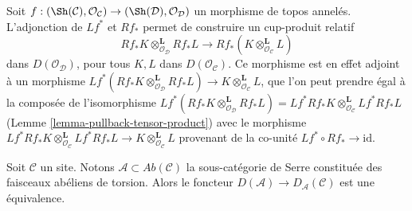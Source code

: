\begin{remark}
\label{remark-cup-product}
Soit $f : (\Sh(\mathcal{C}), \mathcal{O}_\mathcal{C}) \to
(\Sh(\mathcal{D}), \mathcal{O}_\mathcal{D})$ un morphisme de topos
annelés. L'adjonction de $Lf^*$ et $Rf_*$ permet de construire un cup-produit
relatif
$$
Rf_*K \otimes_{\mathcal{O}_\mathcal{D}}^\mathbf{L} Rf_*L
\longrightarrow
Rf_*(K \otimes_{\mathcal{O}_\mathcal{C}}^\mathbf{L} L)
$$
dans $D(\mathcal{O}_\mathcal{D})$, pour tous $K, L$ dans
$D(\mathcal{O}_\mathcal{C})$. Ce morphisme est en effet adjoint à un
morphisme
$Lf^*(Rf_*K \otimes_{\mathcal{O}_\mathcal{D}}^\mathbf{L} Rf_*L) \to
K \otimes_{\mathcal{O}_\mathcal{C}}^\mathbf{L} L$, que l'on peut prendre
égal à la composée de l'isomorphisme
$Lf^*(Rf_*K \otimes_{\mathcal{O}_\mathcal{D}}^\mathbf{L} Rf_*L) =
Lf^*Rf_*K \otimes_{\mathcal{O}_\mathcal{C}}^\mathbf{L} Lf^*Rf_*L$
(Lemme \ref{lemma-pullback-tensor-product}) avec le morphisme
$Lf^*Rf_*K \otimes_{\mathcal{O}_\mathcal{C}}^\mathbf{L} Lf^*Rf_*L
\to K \otimes_{\mathcal{O}_\mathcal{C}}^\mathbf{L} L$
provenant de la co-unité $Lf^* \circ Rf_* \to \text{id}$.
\end{remark}

\begin{lemma}
\label{lemma-torsion}
Soit $\mathcal{C}$ un site. Notons
$\mathcal{A} \subset \textit{Ab}(\mathcal{C})$ la sous-catégorie de Serre
constituée des faisceaux abéliens de torsion. Alors le foncteur
$D(\mathcal{A}) \to D_\mathcal{A}(\mathcal{C})$ est une équivalence.
\end{lemma}

